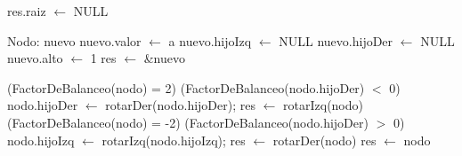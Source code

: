 \begin{Algoritmos}

	\begin{algorithm}[H]
		\NoCaptionOfAlgo
		\caption{}
		res.raiz $\leftarrow$ NULL\;
	\end{algorithm}



	\begin{algorithm}[H]
		\NoCaptionOfAlgo
		\caption{}
	\end{algorithm}

	\begin{algorithm}[H]
		\NoCaptionOfAlgo
		\caption{}
		Nodo: nuevo\;
		nuevo.valor $\leftarrow$ a\; %
		nuevo.hijoIzq $\leftarrow$ NULL\;
		nuevo.hijoDer $\leftarrow$ NULL\;
		nuevo.alto $\leftarrow$ 1\;
		res $\leftarrow$ \&nuevo\;
	\end{algorithm}

	\begin{algorithm}[H]
		\NoCaptionOfAlgo
		\caption{}
		
	\end{algorithm}

	\begin{algorithm}[H]
		\NoCaptionOfAlgo
		\caption{}
		\eIf(FactorDeBalanceo(nodo) = 2){
			\If(FactorDeBalanceo(nodo.hijoDer) $<$ 0){
				nodo.hijoDer $\leftarrow$ rotarDer(nodo.hijoDer);
			}
			res $\leftarrow$ rotarIzq(nodo)\;
		}{
			\eIf(FactorDeBalanceo(nodo) = -2){
				\If(FactorDeBalanceo(nodo.hijoDer) $>$ 0){
					nodo.hijoIzq $\leftarrow$ rotarIzq(nodo.hijoIzq);
				}
				res $\leftarrow$ rotarDer(nodo)\;
			}{
				res $\leftarrow$ nodo\;
			}
		}
	\end{algorithm}



\end{Algoritmos}
